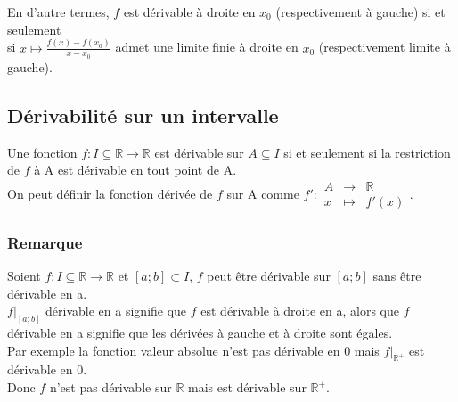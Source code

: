 \documentclass[a4paper,10pt]{book} %
\newcommand{\R}{\mathbb{R}}
\begin{document}
En d'autre termes, $f$ est dérivable à droite en $x_{0}$ (respectivement à gauche) si et seulement\\
si $x\mapsto \frac{f(x)-f(x_{0})}{x-x_{0}}$ admet une limite finie à droite en $x_{0}$ (respectivement limite à gauche).

\subsection{Dérivabilité sur un intervalle}
Une fonction $f : I\subseteq \R \rightarrow \R$ est dérivable sur $A\subseteq I$ si et seulement si la restriction de $f$ à A est dérivable en tout point de A.\\

On peut définir la fonction dérivée de $f$ sur A comme $f' : \begin{array}{rcl}
A&\rightarrow& \R \\
x&\mapsto& f'(x) \end{array}$.

\subsubsection{Remarque}
Soient $f : I\subseteq \R \rightarrow \R$ et $[a;b] \subset I$, $f$ peut être dérivable sur $[a;b]$ sans être dérivable en a.\\

$f|_{[a;b]}$ dérivable en a signifie que $f$ est dérivable à droite en a, alors que $f$ dérivable en a signifie que les dérivées à gauche et à droite sont égales.\\

Par exemple la fonction valeur absolue n'est pas dérivable en 0 mais $f|_{\R^{+}}$ est dérivable en 0.\\
Donc $f$ n'est pas dérivable sur $\R$ mais est dérivable sur $\R^{+}$.
\end{document}
